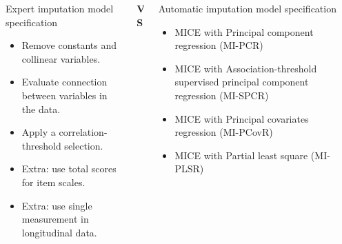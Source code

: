 \documentclass{beamer}\usepackage[]{graphicx}\usepackage[]{xcolor}
\begin{document}
\begin{frame}[fragile]
\begin{columns}[c]
\begin{column}{.46\textwidth}
  \end{column}

  \end{columns}

  \bigskip
  \bigskip


\begin{columns}[T]
\begin{column}{.42\textwidth}

\begin{block}{\centering Expert imputation model specification}

  \begin{itemize}
      \item Remove constants and collinear variables.
      \item Evaluate connection between variables in the data.
      \item Apply a correlation-threshold selection.
      \item Extra: use total scores for item scales.
      \item Extra: use single measurement in longitudinal data.
  \end{itemize}

\end{block}

\end{column}

\begin{column}{.06\textwidth}
  \vspace{5cm}
  \begin{center}
    \huge \textbf{VS}
    \end{center}

  \end{column}

\begin{column}{.42\textwidth}

\begin{block}{\centering Automatic imputation model specification}

  \begin{itemize}
    \item MICE with Principal component regression (MI-PCR)
    \item MICE with Association-threshold supervised principal component regression (MI-SPCR)
    \item MICE with Principal covariates regression (MI-PCovR)
    \item MICE with Partial least square (MI-PLSR)
  \end{itemize}


\end{block}
\end{column}
\end{columns}
\end{frame}
\end{document}
